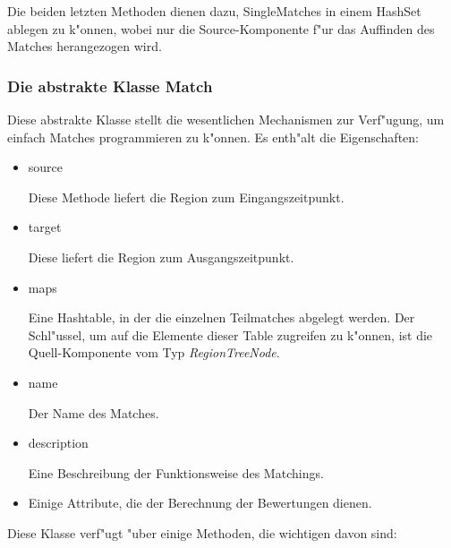 Die beiden letzten Methoden dienen dazu, SingleMatches in einem HashSet ablegen zu k"onnen, wobei nur die Source-Komponente f"ur das Auffinden des Matches herangezogen wird.

\subsubsection{Die abstrakte Klasse Match}
Diese abstrakte Klasse stellt die wesentlichen Mechanismen zur Verf"ugung, um einfach Matches programmieren zu k"onnen. Es enth"alt die Eigenschaften:
\begin{itemize}
\item source

Diese Methode liefert die Region zum Eingangszeitpunkt.

\item target

Diese liefert die Region zum Ausgangszeitpunkt.

\item maps

Eine Hashtable, in der die einzelnen Teilmatches abgelegt werden. Der Schl"ussel, um auf die Elemente dieser Table zugreifen zu k"onnen, ist die Quell-Komponente vom Typ \textit{RegionTreeNode}.

\item name

Der Name des Matches.

\item description

Eine Beschreibung der Funktionsweise des Matchings.

\item Einige Attribute, die der Berechnung der Bewertungen dienen.
\end{itemize} 

Diese Klasse verf"ugt "uber einige Methoden, die wichtigen davon  sind:

